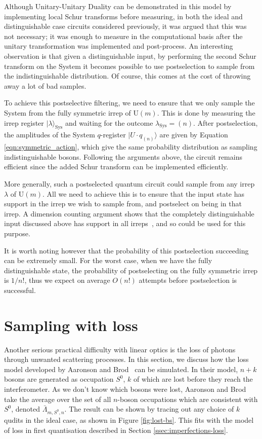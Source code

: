 Although Unitary-Unitary Duality can be demonstrated in this model by implementing local Schur transforms before measuring, in both the ideal and distinguishable case circuits considered previously, it was argued that this was not necessary; it was enough to measure in the computational basis after the unitary transformation was implemented and post-process.
An interesting observation is that given a distinguishable input, by performing the second Schur transform on the System it becomes possible to use postselection to sample from the indistinguishable distribution.
Of course, this comes at the cost of throwing away a lot of bad samples.

To achieve this postselective filtering, we need to ensure that we only sample the System from the fully symmetric irrep of $\textrm{U}(m)$. 
This is done by measuring the irrep register $|\lambda\rangle_{\textrm{Sys}}$ and waiting for the outcome $\lambda_{\textrm{Sys}}=(n)$. 
After postselection, the amplitudes of the System $q$-register $|U\cdot q_{(n)}\rangle$ are given by Equation \ref{eqn:symmetric_action}, which give the same probability distribution as sampling indistinguishable bosons. 
Following the arguments above, the circuit remains efficient since the added Schur transform can be implemented efficiently. 

More generally, such a postselected quantum circuit could sample from any irrep $\lambda$ of $\textrm{U}(m)$. 
All we need to achieve this is to ensure that the input state has support in the irrep we wish to sample from, and postselect on being in that irrep.
A dimension counting argument shows that the completely distinguishable input discussed above has support in all irreps~\cite{stanisic2018}, and so could be used for this purpose.

It is worth noting however that the probability of this postselection succeeding can be extremely small. For the worst case, when we have the fully distinguishable state, the probability of postselecting on the fully symmetric irrep is $1/n!$, thus we expect on average $O(n!)$ attempts before postselection is successful.



\section{Sampling with loss}
\label{sec:nc-loss}

Another serious practical difficulty with linear optics is the loss of photons through unwanted scattering processes. 
In this section, we discuss how the loss model developed by Aaronson and Brod~\cite{aaronson2016} can be simulated. 
In their model, $n+k$ bosons are generated as occupation $S^0$, $k$ of which are lost before they reach the interferometer. 
As we don't know which bosons were lost, Aaronson and Brod take the average over the set of all $n$-boson occupations which are consistent with $S^0$, denoted $\bar{\Lambda}_{m,S^0,n}$.
The result can be shown by tracing out any choice of $k$ qudits in the ideal case, as shown in Figure \ref{fig:lost-bs}. This fits with the model of loss in first quantisation described in Section \ref{ssec:imperfections-loss}.

